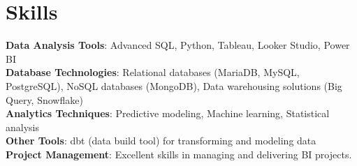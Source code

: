 \section{Skills}
  \begin{itemize}[leftmargin=0.1in, label={}]
    \normalsize{\item{
      \textbf{Data Analysis Tools}: Advanced SQL, Python, Tableau, Looker Studio, Power BI \\
      \textbf{Database Technologies}: Relational databases (MariaDB, MySQL, PostgreSQL), NoSQL databases (MongoDB), Data warehousing solutions (Big Query, Snowflake) \\
      \textbf{Analytics Techniques}: Predictive modeling, Machine learning, Statistical analysis \\
      \textbf{Other Tools}: dbt (data build tool) for transforming and modeling data \\
      \textbf{Project Management}: Excellent skills in managing and delivering BI projects. \\
     }}
  \end{itemize}
